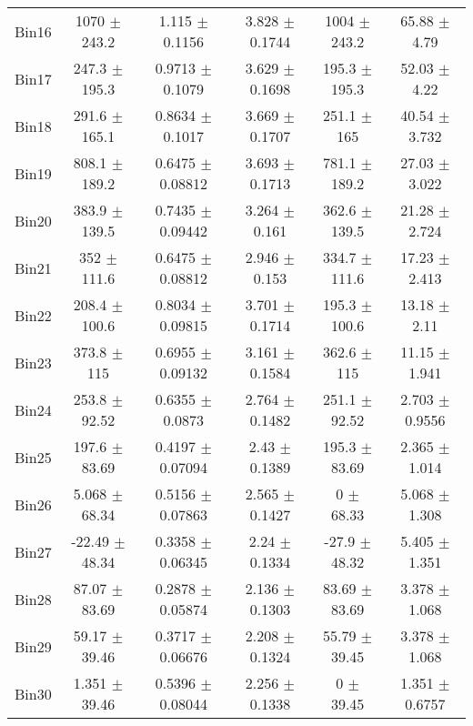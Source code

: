 \begin{tabular}{@{\extracolsep{4pt}}lccccc@{}}
     Bin16 & 1070 $\pm$ 243.2 & 1.115 $\pm$ 0.1156 & 3.828 $\pm$ 0.1744 & 1004 $\pm$ 243.2 & 65.88 $\pm$ 4.79 \\ 
     Bin17 & 247.3 $\pm$ 195.3 & 0.9713 $\pm$ 0.1079 & 3.629 $\pm$ 0.1698 & 195.3 $\pm$ 195.3 & 52.03 $\pm$ 4.22 \\ 
     Bin18 & 291.6 $\pm$ 165.1 & 0.8634 $\pm$ 0.1017 & 3.669 $\pm$ 0.1707 & 251.1 $\pm$ 165 & 40.54 $\pm$ 3.732 \\ 
     Bin19 & 808.1 $\pm$ 189.2 & 0.6475 $\pm$ 0.08812 & 3.693 $\pm$ 0.1713 & 781.1 $\pm$ 189.2 & 27.03 $\pm$ 3.022 \\ 
     Bin20 & 383.9 $\pm$ 139.5 & 0.7435 $\pm$ 0.09442 & 3.264 $\pm$ 0.161 & 362.6 $\pm$ 139.5 & 21.28 $\pm$ 2.724 \\ 
     Bin21 & 352 $\pm$ 111.6 & 0.6475 $\pm$ 0.08812 & 2.946 $\pm$ 0.153 & 334.7 $\pm$ 111.6 & 17.23 $\pm$ 2.413 \\ 
     Bin22 & 208.4 $\pm$ 100.6 & 0.8034 $\pm$ 0.09815 & 3.701 $\pm$ 0.1714 & 195.3 $\pm$ 100.6 & 13.18 $\pm$ 2.11 \\ 
     Bin23 & 373.8 $\pm$ 115 & 0.6955 $\pm$ 0.09132 & 3.161 $\pm$ 0.1584 & 362.6 $\pm$ 115 & 11.15 $\pm$ 1.941 \\ 
     Bin24 & 253.8 $\pm$ 92.52 & 0.6355 $\pm$ 0.0873 & 2.764 $\pm$ 0.1482 & 251.1 $\pm$ 92.52 & 2.703 $\pm$ 0.9556 \\ 
     Bin25 & 197.6 $\pm$ 83.69 & 0.4197 $\pm$ 0.07094 & 2.43 $\pm$ 0.1389 & 195.3 $\pm$ 83.69 & 2.365 $\pm$ 1.014 \\ 
     Bin26 & 5.068 $\pm$ 68.34 & 0.5156 $\pm$ 0.07863 & 2.565 $\pm$ 0.1427 & 0 $\pm$ 68.33 & 5.068 $\pm$ 1.308 \\ 
     Bin27 & -22.49 $\pm$ 48.34 & 0.3358 $\pm$ 0.06345 & 2.24 $\pm$ 0.1334 & -27.9 $\pm$ 48.32 & 5.405 $\pm$ 1.351 \\ 
     Bin28 & 87.07 $\pm$ 83.69 & 0.2878 $\pm$ 0.05874 & 2.136 $\pm$ 0.1303 & 83.69 $\pm$ 83.69 & 3.378 $\pm$ 1.068 \\ 
     Bin29 & 59.17 $\pm$ 39.46 & 0.3717 $\pm$ 0.06676 & 2.208 $\pm$ 0.1324 & 55.79 $\pm$ 39.45 & 3.378 $\pm$ 1.068 \\ 
     Bin30 & 1.351 $\pm$ 39.46 & 0.5396 $\pm$ 0.08044 & 2.256 $\pm$ 0.1338 & 0 $\pm$ 39.45 & 1.351 $\pm$ 0.6757 \\ 
\hline\hline
  \end{tabular}
